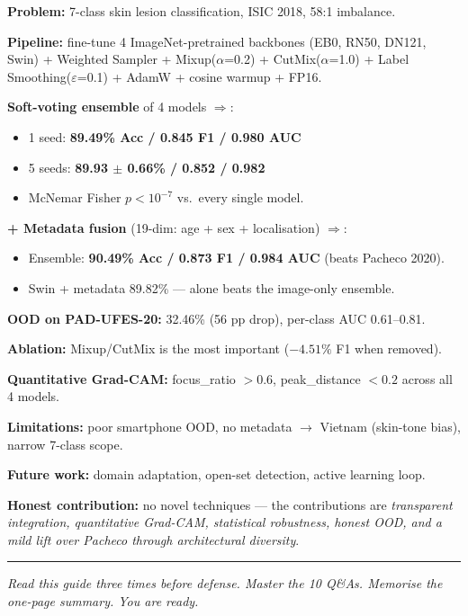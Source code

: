\documentclass[11pt,a4paper]{article}
\begin{document}
\begin{idea}
\textbf{Problem:} 7-class skin lesion classification, ISIC 2018, 58:1 imbalance.

\textbf{Pipeline:} fine-tune 4 ImageNet-pretrained backbones (EB0, RN50, DN121, Swin) + Weighted Sampler + Mixup($\alpha$=0.2) + CutMix($\alpha$=1.0) + Label Smoothing($\varepsilon$=0.1) + AdamW + cosine warmup + FP16.

\textbf{Soft-voting ensemble} of 4 models $\Rightarrow$:
\begin{itemize}[leftmargin=*]
  \item 1 seed: \textbf{89.49\% Acc / 0.845 F1 / 0.980 AUC}
  \item 5 seeds: \textbf{89.93 $\pm$ 0.66\% / 0.852 / 0.982}
  \item McNemar Fisher $p < 10^{-7}$ vs.\ every single model.
\end{itemize}

\textbf{+ Metadata fusion} (19-dim: age + sex + localisation) $\Rightarrow$:
\begin{itemize}[leftmargin=*]
  \item Ensemble: \textbf{90.49\% Acc / 0.873 F1 / 0.984 AUC} (beats Pacheco 2020).
  \item Swin + metadata 89.82\% --- alone beats the image-only ensemble.
\end{itemize}

\textbf{OOD on PAD-UFES-20:} 32.46\% (56 pp drop), per-class AUC 0.61--0.81.

\textbf{Ablation:} Mixup/CutMix is the most important ($-4.51\%$ F1 when removed).

\textbf{Quantitative Grad-CAM:} focus\_ratio $> 0.6$, peak\_distance $< 0.2$ across all 4 models.

\textbf{Limitations:} poor smartphone OOD, no metadata $\to$ Vietnam (skin-tone bias), narrow 7-class scope.

\textbf{Future work:} domain adaptation, open-set detection, active learning loop.

\textbf{Honest contribution:} no novel techniques --- the contributions are \textit{transparent integration, quantitative Grad-CAM, statistical robustness, honest OOD, and a mild lift over Pacheco through architectural diversity}.
\end{idea}

\vspace{12pt}
\hrule
\vspace{6pt}
\begin{center}
\small \textit{Read this guide three times before defense. Master the 10 Q\&As. Memorise the one-page summary. You are ready.}
\end{center}
\end{document}
